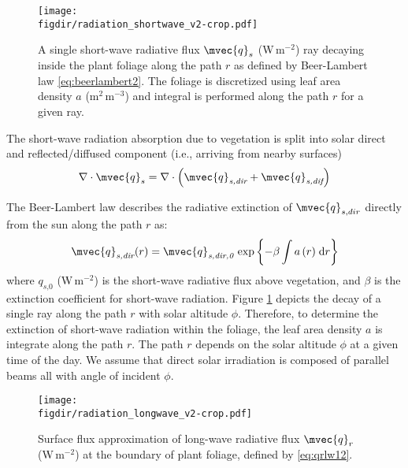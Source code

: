 \begin{figure}[t]
	\centering
	\texttt{[image: \\figdir/radiation\_shortwave\_v2-crop.pdf]}
	\caption{A single short-wave radiative flux $\mvec{q}_s$ (W\,m$^{-2}$) ray decaying inside the plant foliage along the path $r$ as defined by Beer-Lambert law  \cref{eq:beerlambert2}. The foliage is discretized using leaf area density $a$ (m$^2$\,m$^{-3}$) and integral is performed along the path $r$ for a given ray.}
	\label{fig:radiation_shortwave}
\end{figure}

The short-wave radiation absorption due to vegetation is split into solar direct and reflected/diffused component (i.e., arriving from nearby surfaces)
\begin{equation}
\nabla \cdot \mvec{q}_s = \nabla \cdot \left(\mvec{q}_{\textit{s,dir}} + \mvec{q}_{\textit{s,dif}} \right)
\end{equation}

The Beer-Lambert law describes the radiative extinction of $\mvec{q}_{s,dir}$ directly from the sun along the path $r$ as:
\begin{equation}
\mvec{q}_{\textit{s,dir}}(r) = \mvec{q}_{\textit{s,dir,0}}\,\exp\left\{ - \beta \int{a\left( r \right)} \;\mathrm{d}r \right\}
\label{eq:beerlambert2}
\end{equation}
where $q_{\textit{s,0}}$ (W\,m$^{-2}$) is the short-wave radiative flux above vegetation, and $\beta$ is the extinction coefficient for short-wave radiation. Figure \cref{fig:radiation_shortwave} depicts the decay of a single ray along the path $r$ with solar altitude $\phi$. Therefore, to determine the extinction of short-wave radiation within the foliage, the leaf area density $a$ is integrate along the path $r$. The path $r$ depends on the solar altitude $\phi$ at a given time of the day. We assume that direct solar irradiation is composed of parallel beams all with angle of incident $\phi$.

	\begin{figure}[t]
		\centering
		\texttt{[image: \\figdir/radiation\_longwave\_v2-crop.pdf]}
		\caption{Surface flux approximation of long-wave radiative flux $\mvec{q}_r$ (W\,m$^{-2}$) at the boundary of plant foliage, defined by \cref{eq:qrlw12}.}
		\label{fig:radiation_longwave}
	\end{figure}

